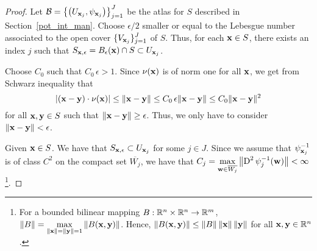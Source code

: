 \begin{proof}
Let $\displaystyle \mathcal{B} = \left\{ \left(U_{\mathbf{x}_j},
\psi_{\mathbf{x}_j}\right) \right \}_{j=1}^J$ be the atlas for
$S$ described in Section~\ref{pot_int_man}.
Choose $\epsilon/2$ smaller or equal to the Lebesgue number associated
to the open cover $\displaystyle \{ V_{\mathbf{x}_j}\}_{j=1}^J$ of $S$.  Thus,
for each $\mathbf{x} \in S$, there exists an index $j$ such that
$\displaystyle
S_{\mathbf{x},\epsilon} = B_{\epsilon}(\mathbf{x}) \cap S \subset U_{\mathbf{x}_j}$.

Choose $C_0$ such that $C_0\,\epsilon > 1$.  Since
$\mathbf{\nu}(\mathbf{x})$ is of norm one for all $\mathbf{x}$, we get from
Schwarz inequality that
\[
\left| (\mathbf{x}-\mathbf{y}) \cdot \mathbf{\nu}(\mathbf{x}) \right|
\leq \|\mathbf{x}-\mathbf{y}\|
\leq C_0\,\epsilon \|\mathbf{x}-\mathbf{y}\|
\leq C_0 \|\mathbf{x}-\mathbf{y}\|^2
\]
for all $\mathbf{x}, \mathbf{y} \in S$ such that
$\|\mathbf{x}-\mathbf{y}\| \geq \epsilon$.
Thus, we only have to consider $\|\mathbf{x}-\mathbf{y}\| < \epsilon$.

Given $\mathbf{x} \in S$.  We have that
$\displaystyle S_{\mathbf{x},\epsilon} \subset U_{\mathbf{x}_j}$ for some $j \in J$.
Since we assume that
$\displaystyle \psi_{\mathbf{x}_j}^{-1}$ is of class $C^2$ on the compact set
$\displaystyle \overline{W_j}$, we
have that $\displaystyle C_j = \max_{\mathbf{w} \in \overline{W_j}}
\left\| \operatorname{D}^2 \psi_j^{-1}(\mathbf{w}) \right\| < \infty$
\footnote{For a bounded bilinear mapping $B:\mathbb{R}^n \times \mathbb{R}^n \to \mathbb{R}^m$,
$\displaystyle \|B\| = \max_{\|\mathbf{x}\|= \|\mathbf{y}\|=1}
\|B(\mathbf{x},\mathbf{y})\|$.
Hence, $\|B(\mathbf{x},\mathbf{y})\| \leq \|B\| \, \|\mathbf{x}\|\, \|\mathbf{y}\|$
for all $\mathbf{x}, \mathbf{y} \in \mathbb{R}^n$.}.


\end{proof}
